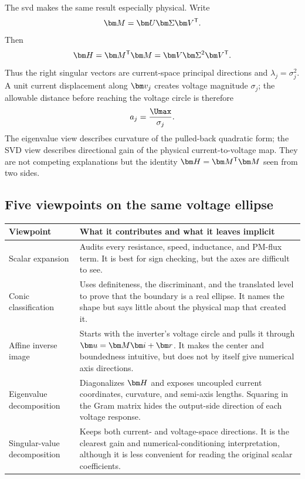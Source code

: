 The \gls{svd} makes the same result especially physical.  Write
\begin{equation}
 \Apsm=\matr U\matr\Sigma\matr V\trans.
\end{equation}
Then
\begin{equation}
 \Hpsm=\Apsm\trans\Apsm
 =\matr V\matr\Sigma^2\matr V\trans.
\end{equation}
Thus the right singular vectors are current-space principal directions and
$\lambda_j=\sigma_j^2$.  A unit current displacement along $\vect v_j$
creates voltage magnitude $\sigma_j$; the allowable distance before reaching
the voltage circle is therefore
\begin{equation}
 a_j=\frac{\Umax}{\sigma_j}.
\end{equation}
The eigenvalue view describes curvature of the pulled-back quadratic form; the
SVD view describes directional gain of the physical current-to-voltage map.
They are not competing explanations but the identity $\Hpsm=\Apsm\trans\Apsm$
seen from two sides.



\subsection{Five viewpoints on the same voltage ellipse}

\begin{center}
\small
\begin{tabularx}{\linewidth}{@{}>{\raggedright\arraybackslash}p{.25\linewidth}X@{}}
\toprule
Viewpoint & What it contributes and what it leaves implicit\\
\midrule
Scalar expansion &
Audits every resistance, speed, inductance, and PM-flux term.  It is best for
sign checking, but the axes are difficult to see.\\
Conic classification &
Uses definiteness, the discriminant, and the translated level to prove that
the boundary is a real ellipse.  It names the shape but says little about the
physical map that created it.\\
Affine inverse image &
Starts with the inverter's voltage circle and pulls it through
$\voltage=\Apsm\current+\vect r$.  It makes the center and boundedness
intuitive, but does not by itself give numerical axis directions.\\
Eigenvalue decomposition &
Diagonalizes $\Hpsm$ and exposes uncoupled current coordinates, curvature, and
semi-axis lengths.  Squaring in the Gram matrix hides the output-side
direction of each voltage response.\\
Singular-value decomposition &
Keeps both current- and voltage-space directions.  It is the clearest gain and
numerical-conditioning interpretation, although it is less convenient for
reading the original scalar coefficients.\\
\bottomrule
\end{tabularx}
\end{center}

